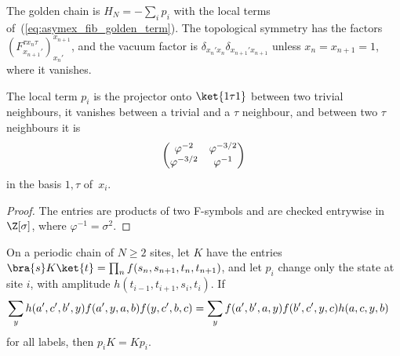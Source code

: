 \begin{definition}%
    \label{def:asymex_fib_golden_chain}
    \leanok
    The golden chain is $H_N=-\sum_ip_i$ with the local terms
    of~(\ref{eq:asymex_fib_golden_term}). The topological symmetry has the
    factors $\left(F^{\tau x_n\tau}_{x_{n+1}'}\right)_{x_n'}^{x_{n+1}}$, and the
    vacuum factor is $\delta_{x_n'x_n}\delta_{x_{n+1}'x_{n+1}}$ unless
    $x_n=x_{n+1}=1$, where it vanishes.
\end{definition}

\begin{lemma}%
    \label{thm:asymex_fib_golden_term_values}
    \leanok
    The local term $p_i$ is the projector onto $\ket{1\tau1}$ between two
    trivial neighbours, it vanishes between a trivial and a $\tau$ neighbour,
    and between two $\tau$ neighbours it is
    \begin{align}
        \begin{pmatrix}
            \varphi^{-2}   & \varphi^{-3/2} \\
            \varphi^{-3/2} & \varphi^{-1}
        \end{pmatrix}
        \notag
    \end{align}
    in the basis $1,\tau$ of~$x_i$.
\end{lemma}

\begin{proof}
    \leanok
    The entries are products of two F-symbols and are checked entrywise in
    $\Z[\sigma]$, where $\varphi^{-1}=\sigma^2$.
\end{proof}

\begin{lemma}%
    \label{thm:mpo_site_operator_neighbour_kernel}
    \leanok
    On a periodic chain of $N\geq2$ sites, let $K$ have the entries
    $\bra{s}K\ket{t}=\prod_nf(s_n,s_{n+1},t_n,t_{n+1})$, and let $p_i$ change
    only the state at site $i$, with amplitude $h(t_{i-1},t_{i+1},s_i,t_i)$.
    If
    \begin{align}
        \sum_yh(a',c',b',y)f(a',y,a,b)f(y,c',b,c)
         & =\sum_yf(a',b',a,y)f(b',c',y,c)h(a,c,y,b)
        \notag
    \end{align}
    for all labels, then $p_iK=Kp_i$.
\end{lemma}

